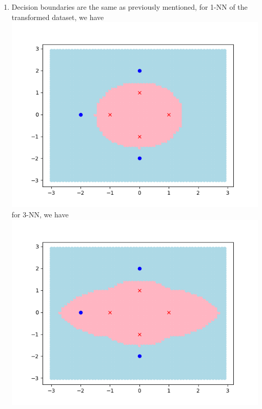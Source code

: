 \documentclass{article}
\begin{document}
\begin{enumerate}
\begin{enumerate}[label=(\alph*)]
            \item Decision boundaries are the same as previously mentioned, for 1-NN of the transformed dataset, we have \\ \includegraphics[scale=0.5]{images/p6_1_b.png}\\[0.25in]
            for 3-NN, we have \\ \includegraphics[scale=0.5]{images/p6_1_b_3.png}
        \end{enumerate}
        

\end{enumerate}
\end{document}
